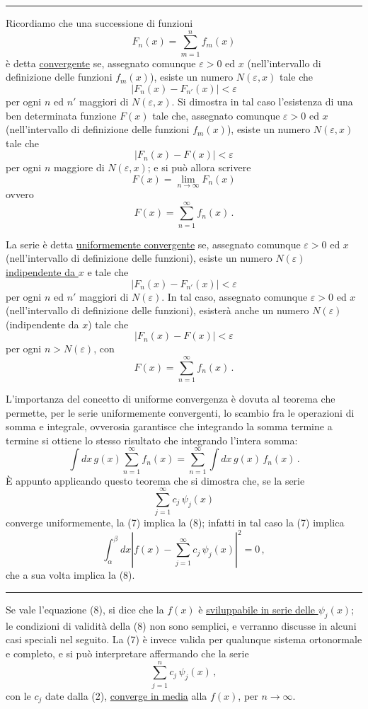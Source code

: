 \documentclass[11pt, a4paper]{book}
\numberwithin{equation}{section}
\begin{document}
\hrule
\medskip
Ricordiamo che una successione di funzioni
\[
F_n(x)=\sum_{m=1}^{n}f_m(x)
\]
è detta \underline{convergente} se, assegnato comunque $\varepsilon>0$ ed $x$ (nell'intervallo di definizione delle funzioni $f_m(x)$), esiste un numero $N(\varepsilon,x)$ tale che
\[
|F_n(x)-F_{n'}(x)|<\varepsilon
\]
per ogni $n$ ed $n'$ maggiori di $N(\varepsilon,x)$. Si dimostra in tal caso l'esistenza di una ben determinata funzione $F(x)$ tale che, assegnato comunque $\varepsilon>0$ ed $x$ (nell'intervallo di definizione delle funzioni $f_m(x)$), esiste un numero $N(\varepsilon,x)$ tale che
\[
|F_n(x)-F(x)|<\varepsilon
\]
per ogni $n$ maggiore di $N(\varepsilon,x)$; e si può allora scrivere
\[
F(x)=\lim_{n\to\infty}F_n(x)
\]
ovvero
\[
F(x)=\sum_{n=1}^{\infty}f_n(x)\,.
\]

La serie è detta \underline{uniformemente convergente} se, assegnato comunque $\varepsilon>0$ ed $x$ (nell'intervallo di definizione delle funzioni), esiste un numero $N(\varepsilon)$ \underline{indipendente da $x$} e tale che
\[
|F_n(x)-F_{n'}(x)|<\varepsilon
\]
per ogni $n$ ed $n'$ maggiori di $N(\varepsilon)$. In tal caso, assegnato comunque $\varepsilon>0$ ed $x$ (nell'intervallo di definizione delle funzioni), esisterà anche un numero $N(\varepsilon)$ (indipendente da $x$) tale che
\[
|F_n(x)-F(x)|<\varepsilon
\]
per ogni $n>N(\varepsilon)$, con
\[
F(x)=\sum_{n=1}^{\infty}f_n(x)\,.
\]

L'importanza del concetto di uniforme convergenza è dovuta al teorema che permette, per le serie uniformemente convergenti, lo scambio fra le operazioni di somma e integrale, ovverosia garantisce che integrando la somma termine a termine si ottiene lo stesso risultato che integrando l'intera somma:
\[
\int dx\, g(x)\sum_{n=1}^{\infty}f_n(x)=\sum_{n=1}^{\infty}\int dx\, g(x)\,f_n(x)\,.
\]
È appunto applicando questo teorema che si dimostra che, se la serie
\[
\sum_{j=1}^{\infty}c_j\,\psi_j(x)
\]
converge uniformemente, la (7) implica la (8); infatti in tal caso la (7) implica
\[
\int_\alpha^\beta dx\left|f(x)-\sum_{j=1}^{\infty}c_j\,\psi_j(x)\right|^2=0\,,
\]
che a sua volta implica la (8).
\medskip\hrule\medskip

Se vale l'equazione (8), si dice che la $f(x)$ è \underline{sviluppabile in serie delle $\psi_j(x)$}; le condizioni di validità della (8) non sono semplici, e verranno discusse in alcuni casi speciali nel seguito. La (7) è invece valida per qualunque sistema ortonormale e completo, e si può interpretare affermando che la serie
\[
\sum_{j=1}^{n}c_j\,\psi_j(x)\,,
\]
con le $c_j$ date dalla (2), \underline{converge in media} alla $f(x)$, per $n\to\infty$.
\end{document}
